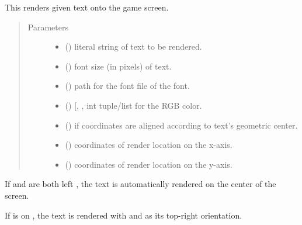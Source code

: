 \documentclass[letterpaper,10pt,english,openany,oneside]{sphinxmanual}
\begin{document}
\begin{fulllineitems}
\label{\detokenize{index:interface.text_blit}}
This renders given text onto the game screen.
\begin{quote}\begin{description}
\item[{Parameters}] \leavevmode\begin{itemize}
\item {} 
 () \textendash{} literal string of text to be rendered.

\item {} 
 () \textendash{} font size (in pixels) of text.

\item {} 
 () \textendash{} path for the font file  of the font.

\item {} 
 () \textendash{} {[}, , \sphinxcode{\sphinxupquote{blue}}{]} int tuple/list for the RGB color.

\item {} 
 () \textendash{} if coordinates are aligned according to text’s geometric center.

\item {} 
 () \textendash{} coordinates of render location on the x-axis.

\item {} 
 () \textendash{} coordinates of render location on the y-axis.

\end{itemize}

\end{description}\end{quote}

If  and  are both left , the text is automatically rendered on the center of the screen.

If  is on , the text is rendered with  and  as its top-right orientation.

\end{fulllineitems}
\end{document}
